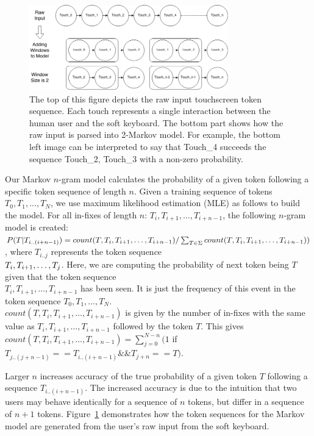 \documentclass{acm_proc_article-sp}
\begin{document}
\begin{figure}
\centering
\includegraphics[width=3.4in]{figures/markov_model_building.png}
\caption{The top of this figure depicts the raw input touchscreen token sequence. Each touch represents a single interaction between the human user and the soft keyboard. The bottom part shows how the raw input is parsed into 2-Markov model. For example, the bottom left image can be interpreted to say that Touch\_4 succeeds the sequence Touch\_2, Touch\_3 with a non-zero probability.}
\label{fig:markov_model_building}
\end{figure}


Our Markov $n$-gram model calculates the probability of a given token following a specific 
token sequence of length $n$.
Given a training sequence of tokens $T_0, T_1, \dots , T_N$,
we use maximum likelihood estimation (MLE) as follows to build the model.
For all in-fixes of
length $n$: $T_i, T_{i+1}, \dots , T_{i+n-1}$,
the following $n$-gram model is created:
$P(T | T_{i..(i+n-1)}) =  count(T, T_i, T_{i+1}, \dots , T_{i+n-1})/\sum_{T \in \Sigma} count(
T, T_i, T_{i+1}, \dots , \\T_{i+n-1}))$, where $T_{i..j}$ represents the
token sequence \\
$T_i, T_{i+\\1}, \dots, T_j$.
Here, we are computing the probability of next token being $T$
given that the token sequence \\
$T_i, T_{i+1}, \dots , T_{i+n-1}$ has been seen.
It is just the
frequency of this event in the token sequence $T_0, T_1, \dots , T_N$. \\
$count(T, T_i, T_{i+1}, \dots , T_{i+n-1})$ is given by the number of in-fixes with the same value as
$T_i, T_{i+1}, \dots , T_{i+n-1}$ followed by the token $T$. This gives 
$count(T, T_i, T_{i+1}, \dots , T_{i+n-1}) = \sum_{j=0}^{N-n}(1$ if $T_{j..(j+n-1)} == T_{i..(i+n-1)} \&\&
T_{j+n} == T)$.

Larger $n$ increases accuracy of the true probability of a given token $T$ following
a sequence $T_{i..(i+n-1)}$.
The increased accuracy is due to the intuition that 
two users may behave identically for a sequence of $n$ tokens, but
differ in a sequence of $n+1$ tokens.
Figure~\ref{fig:markov_model_building} demonstrates how the token sequences for the Markov model are generated from the user's raw input from the soft keyboard.
\end{document}
